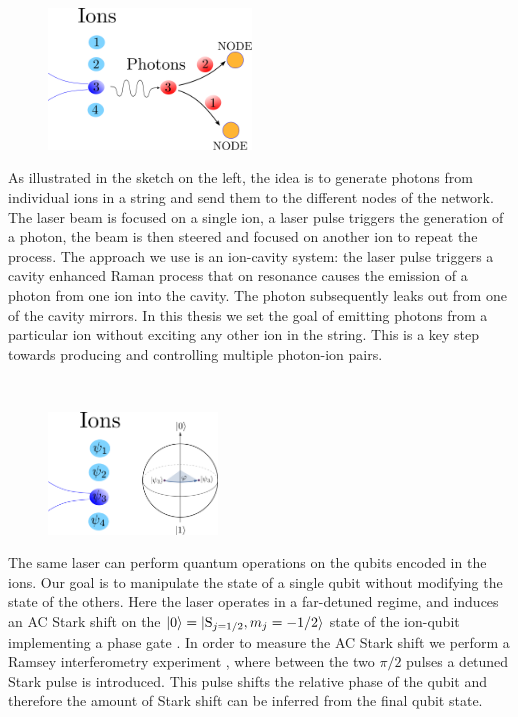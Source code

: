 \documentclass[english, a4paper, 12pt, twoside]{book}
\numberwithin{equation}{section} %
\begin{document}
\\
\begin{figure}
  \centering
    \includegraphics[width=0.48\textwidth]{photongeneration3}
\end{figure}
As illustrated in the sketch on the left, the idea is to generate photons from individual ions in a string and send them to the different nodes of the network. The laser beam is focused on a single ion, a laser pulse triggers the generation of a photon, the beam is then steered and focused on another ion to repeat the process. The approach we use is an ion-cavity system: the laser pulse triggers a cavity enhanced Raman process \cite{stuteinterface} that on resonance causes the emission of a photon from one ion into the cavity. The photon subsequently leaks out from one of the cavity mirrors. In this thesis we set the goal of emitting photons from a particular ion without exciting any other ion in the string. This is a key step towards producing and controlling multiple photon-ion pairs.

\\

\begin{figure}
\centering
    \includegraphics[width=0.4\textwidth]{qubitmanipulation}
\end{figure}
\vspace{-1.4em} The same laser can perform quantum operations on the qubits encoded in the ions. Our goal is to manipulate the state of a single qubit without modifying the state of the others. Here the laser operates in a far-detuned regime, and induces an AC Stark shift on the $\ket{0} = \ket{\text{S}_{j=1/2}, m_j=-1/2}$ state of the ion-qubit implementing a phase gate \cite{chuang}. In order to measure the AC Stark shift we perform a Ramsey interferometry experiment \cite{starkshift}, where between the two $\pi/2$ pulses a detuned Stark pulse is introduced. This pulse shifts the relative phase of the qubit and therefore the amount of Stark shift can be inferred from the final qubit state.
\end{document}
